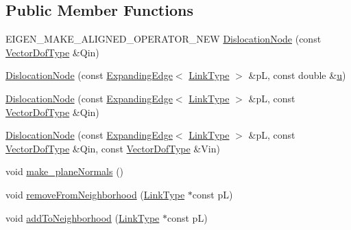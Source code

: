 \subsection*{Public Member Functions}
\begin{DoxyCompactItemize}
\item 
E\+I\+G\+E\+N\+\_\+\+M\+A\+K\+E\+\_\+\+A\+L\+I\+G\+N\+E\+D\+\_\+\+O\+P\+E\+R\+A\+T\+O\+R\+\_\+\+N\+E\+W \hyperlink{classmodel_1_1_dislocation_node_aa6a473ea85aa272dcabe8a91a1efd08a}{Dislocation\+Node} (const \hyperlink{classmodel_1_1_dislocation_node_a7def555ec4b0751177d47d703c8f9282}{Vector\+Dof\+Type} \&Qin)
\item 
\hyperlink{classmodel_1_1_dislocation_node_abfa41b215454f5f2a0387814ad73ecf0}{Dislocation\+Node} (const \hyperlink{structmodel_1_1_expanding_edge}{Expanding\+Edge}$<$ \hyperlink{_spline_node_base__corder0_8h_ab09ccc0af6ea9402dfef7b0eac55cff3}{Link\+Type} $>$ \&p\+L, const double \&\hyperlink{angle_axis_8m_a52688d77a393e5a594a1e82658e634b6}{u})
\item 
\hyperlink{classmodel_1_1_dislocation_node_a5f75702b8fefa5ed5ac030e514b34481}{Dislocation\+Node} (const \hyperlink{structmodel_1_1_expanding_edge}{Expanding\+Edge}$<$ \hyperlink{_spline_node_base__corder0_8h_ab09ccc0af6ea9402dfef7b0eac55cff3}{Link\+Type} $>$ \&p\+L, const \hyperlink{classmodel_1_1_dislocation_node_a7def555ec4b0751177d47d703c8f9282}{Vector\+Dof\+Type} \&Qin)
\item 
\hyperlink{classmodel_1_1_dislocation_node_a877a089ddfbb7e50338736743e698c63}{Dislocation\+Node} (const \hyperlink{structmodel_1_1_expanding_edge}{Expanding\+Edge}$<$ \hyperlink{_spline_node_base__corder0_8h_ab09ccc0af6ea9402dfef7b0eac55cff3}{Link\+Type} $>$ \&p\+L, const \hyperlink{classmodel_1_1_dislocation_node_a7def555ec4b0751177d47d703c8f9282}{Vector\+Dof\+Type} \&Qin, const \hyperlink{classmodel_1_1_dislocation_node_a7def555ec4b0751177d47d703c8f9282}{Vector\+Dof\+Type} \&Vin)
\item 
void \hyperlink{classmodel_1_1_dislocation_node_a16f9a0b8a881ff2fde06b4bf8b53a87e}{make\+\_\+plane\+Normals} ()
\item 
void \hyperlink{classmodel_1_1_dislocation_node_aaf926c744c34f37460ef7f9d7b8f7421}{remove\+From\+Neighborhood} (\hyperlink{_spline_node_base__corder0_8h_ab09ccc0af6ea9402dfef7b0eac55cff3}{Link\+Type} $\ast$const p\+L)
\item 
void \hyperlink{classmodel_1_1_dislocation_node_adc7f6d9e3aa3d5f7d79c4558e7517d8a}{add\+To\+Neighborhood} (\hyperlink{_spline_node_base__corder0_8h_ab09ccc0af6ea9402dfef7b0eac55cff3}{Link\+Type} $\ast$const p\+L)

\end{DoxyCompactItemize}

